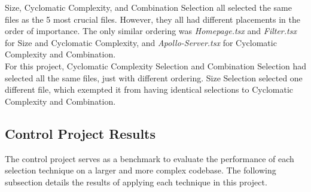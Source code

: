 Size, Cyclomatic Complexity, and Combination Selection all selected the same files as the 5 most crucial files. However, they all had different placements in the order of importance. The only similar ordering was \textit{Homepage.tsx} and \textit{Filter.tsx} for Size and Cyclomatic Complexity, and \textit{Apollo-Server.tsx} for Cyclomatic Complexity and Combination. \\

For this project, Cyclomatic Complexity Selection and Combination Selection had selected all the same files, just with different ordering. Size Selection selected one different file, which exempted it from having identical selections to Cyclomatic Complexity and Combination. \\



\subsection{Control Project Results} 
The control project serves as a benchmark to evaluate the performance of each selection technique on a larger and more complex codebase. The following subsection details the results of applying each technique in this project.

